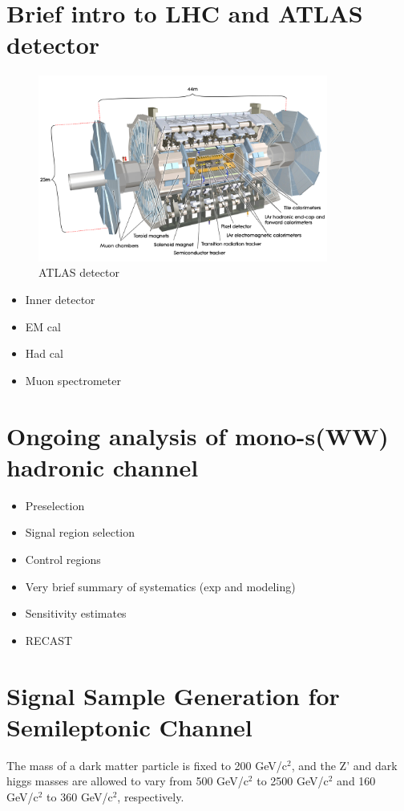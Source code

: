 \documentclass[12pt]{article}
\begin{document}
\section{Brief intro to LHC and ATLAS detector}
\begin{figure}[H]
	\centering
	\includegraphics[width=0.85\textwidth]{figures/detector.jpg}
	\caption{ATLAS detector}
	\label{fig:detector}
\end{figure}
\begin{itemize}
\item Inner detector
\item EM cal
\item Had cal
\item Muon spectrometer
\end{itemize}

\section{Ongoing analysis of mono-s(WW) hadronic channel}
\begin{itemize}
\item Preselection
\item Signal region selection
\item Control regions
\item Very brief summary of systematics (exp and modeling)
\item Sensitivity estimates
\item RECAST
\end{itemize}

\section{Signal Sample Generation for Semileptonic Channel}

The mass of a dark matter particle is fixed to 200 GeV/c$^2$, and the Z' and dark higgs masses are allowed to vary from 500 GeV/c$^2$ to 2500 GeV/c$^2$ and 160 GeV/c$^2$ to 360 GeV/c$^2$, respectively. 
\end{document}
